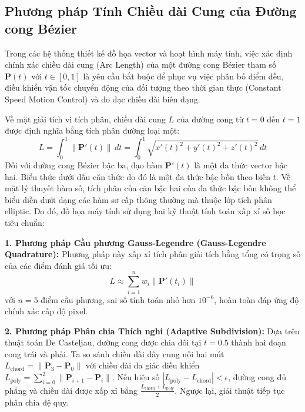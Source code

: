 \subsection{Phương pháp Tính Chiều dài Cung của Đường cong Bézier}
\label{subsec:bezier_arc_length}

Trong các hệ thống thiết kế đồ họa vector và hoạt hình máy tính, việc xác định chính xác chiều dài cung (Arc Length) của một đường cong Bézier tham số $\mathbf{P}(t)$ với $t \in [0, 1]$ là yêu cầu bắt buộc để phục vụ việc phân bố điểm đều, điều khiển vận tốc chuyển động của đối tượng theo thời gian thực (Constant Speed Motion Control) và đo đạc chiều dài biên dạng.

Về mặt giải tích vi tích phân, chiều dài cung $L$ của đường cong từ $t = 0$ đến $t = 1$ được định nghĩa bằng tích phân đường loại một:
\begin{equation}
\label{eq:bezier_length_integral}
L = \int_0^1 \|\mathbf{P}'(t)\| \, dt = \int_0^1 \sqrt{x'(t)^2 + y'(t)^2 + z'(t)^2} \, dt
\end{equation}
Đối với đường cong Bézier bậc ba, đạo hàm $\mathbf{P}'(t)$ là một đa thức vector bậc hai. Biểu thức dưới dấu căn thức do đó là một đa thức bậc bốn theo biến $t$. Về mặt lý thuyết hàm số, tích phân của căn bậc hai của đa thức bậc bốn không thể biểu diễn dưới dạng các hàm sơ cấp thông thường mà thuộc lớp tích phân elliptic. Do đó, đồ họa máy tính sử dụng hai kỹ thuật tính toán xấp xỉ số học tiêu chuẩn:

\textbf{1. Phương pháp Cầu phương Gauss-Legendre (Gauss-Legendre Quadrature):}
Phương pháp này xấp xỉ tích phân giải tích bằng tổng có trọng số của các điểm đánh giá tối ưu:
\begin{equation}
L \approx \sum_{i=1}^n w_i \|\mathbf{P}'(t_i)\|
\end{equation}
với $n = 5$ điểm cầu phương, sai số tính toán nhỏ hơn $10^{-6}$, hoàn toàn đáp ứng độ chính xác cấp độ pixel.

\textbf{2. Phương pháp Phân chia Thích nghi (Adaptive Subdivision):}
Dựa trên thuật toán De Casteljau, đường cong được chia đôi tại $t = 0.5$ thành hai đoạn cong trái và phải. Ta so sánh chiều dài dây cung nối hai mút $L_{\text{chord}} = \|\mathbf{P}_3 - \mathbf{P}_0\|$ với chiều dài đa giác điều khiển $L_{\text{poly}} = \sum_{i=0}^2 \|\mathbf{P}_{i+1} - \mathbf{P}_i\|$. Nếu hiệu số $|L_{\text{poly}} - L_{\text{chord}}| < \epsilon$, đường cong đủ phẳng và chiều dài được xấp xỉ bằng $\frac{L_{\text{chord}} + L_{\text{poly}}}{2}$. Ngược lại, giải thuật tiếp tục phân chia đệ quy.

